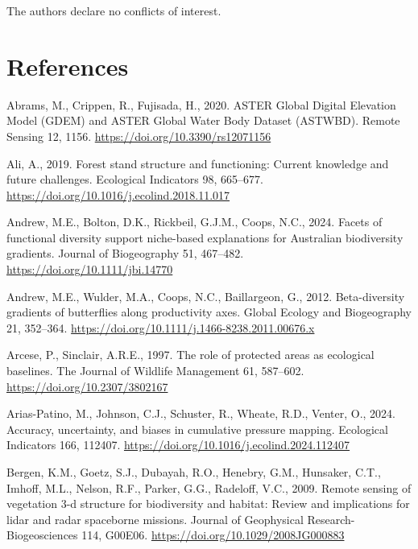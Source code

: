 \documentclass[
]{agujournal2019}
\newlength{\cslhangindent}
\newenvironment{CSLReferences}[2] %
 {\begin{list}{}{%
  \setlength{\itemindent}{0pt}
  \setlength{\leftmargin}{0pt}
  \setlength{\parsep}{0pt}
  \ifodd #1
   \setlength{\leftmargin}{\cslhangindent}
   \setlength{\itemindent}{-1\cslhangindent}
  \fi
  \setlength{\itemsep}{#2\baselineskip}}}
 {\end{list}}
\begin{document}
The authors declare no conflicts of interest.

\newpage

\section*{References}\label{references}

\label{refs}
\begin{CSLReferences}{1}{0}
\vspace{1em}

Abrams, M., Crippen, R., Fujisada, H., 2020. ASTER Global Digital
Elevation Model (GDEM) and ASTER Global Water Body Dataset (ASTWBD).
Remote Sensing 12, 1156. \url{https://doi.org/10.3390/rs12071156}

Ali, A., 2019. Forest stand structure and functioning: Current knowledge
and future challenges. Ecological Indicators 98, 665--677.
\url{https://doi.org/10.1016/j.ecolind.2018.11.017}

Andrew, M.E., Bolton, D.K., Rickbeil, G.J.M., Coops, N.C., 2024. Facets
of functional diversity support niche-based explanations for Australian
biodiversity gradients. Journal of Biogeography 51, 467--482.
\url{https://doi.org/10.1111/jbi.14770}

Andrew, M.E., Wulder, M.A., Coops, N.C., Baillargeon, G., 2012.
Beta-diversity gradients of butterflies along productivity axes. Global
Ecology and Biogeography 21, 352--364.
\url{https://doi.org/10.1111/j.1466-8238.2011.00676.x}

Arcese, P., Sinclair, A.R.E., 1997. The role of protected areas as
ecological baselines. The Journal of Wildlife Management 61, 587--602.
\url{https://doi.org/10.2307/3802167}

Arias-Patino, M., Johnson, C.J., Schuster, R., Wheate, R.D., Venter, O.,
2024. Accuracy, uncertainty, and biases in cumulative pressure mapping.
Ecological Indicators 166, 112407.
\url{https://doi.org/10.1016/j.ecolind.2024.112407}

Bergen, K.M., Goetz, S.J., Dubayah, R.O., Henebry, G.M., Hunsaker, C.T.,
Imhoff, M.L., Nelson, R.F., Parker, G.G., Radeloff, V.C., 2009. Remote
sensing of vegetation 3-d structure for biodiversity and habitat: Review
and implications for lidar and radar spaceborne missions. Journal of
Geophysical Research-Biogeosciences 114, G00E06.
\url{https://doi.org/10.1029/2008JG000883}


\end{CSLReferences}
\end{document}

